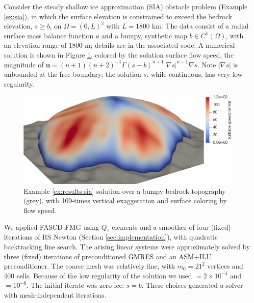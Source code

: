 \documentclass[review,hidelinks,onefignum,onetabnum]{siamart220329}
\newcommand{\grad}{\nabla}
\begin{document}
\begin{example}   \label{ex:results:sia}
Consider the steady shallow ice approximation (SIA) obstacle problem (Example \ref{ex:sia}), in which the surface elevation is constrained to exceed the bedrock elevation, $s\ge b$, on $\Omega=(0,L)^2$ with $L=1800$ km.  The data consist of a radial surface mass balance function $a$ \cite[equation (5.122)]{GreveBlatter2009} and a bumpy, synthetic map $b\in C^1(\Omega)$, with an elevation range of $1800$ m; details are in the associated code.  A numerical solution is shown in Figure \ref{fig:results:siascene}, colored by the solution surface flow speed, the magnitude of $\mathbf{u} = (n+1)(n+2)^{-1} \Gamma (s-b)^{n+1} |\grad s|^{n-1} \grad s$.  Note $|\grad s|$ is unbounded at the free boundary; the solution $s$, while continuous, has very low regularity.

\begin{figure}[ht]
\centering
\includegraphics[width=1.0\textwidth]{fixfigs/sialev8scene.png}
\caption{Example \ref{ex:results:sia} solution over a bumpy bedrock topography (grey), with 100-times vertical exaggeration and surface coloring by flow speed.}
\label{fig:results:siascene}
\end{figure}

We applied FASCD FMG using $Q_1$ elements and a smoother of four (fixed) iterations of RS Newton (Section \ref{sec:implementation}), with quadratic backtracking line search.  The arising linear systems were approximately solved by three (fixed) iterations of preconditioned GMRES and an ASM+ILU preconditioner.  The coarse mesh was relatively fine, with $m_0=21^2$ vertices and 400 cells.  Because of the low regularity of the solution we used  $= 2 \times 10^{-4}$ and  $= 10^{-8}$.  The initial iterate was zero ice: $s=b$.  These choices generated a solver with mesh-independent iterations.


\end{example}
\end{document}
